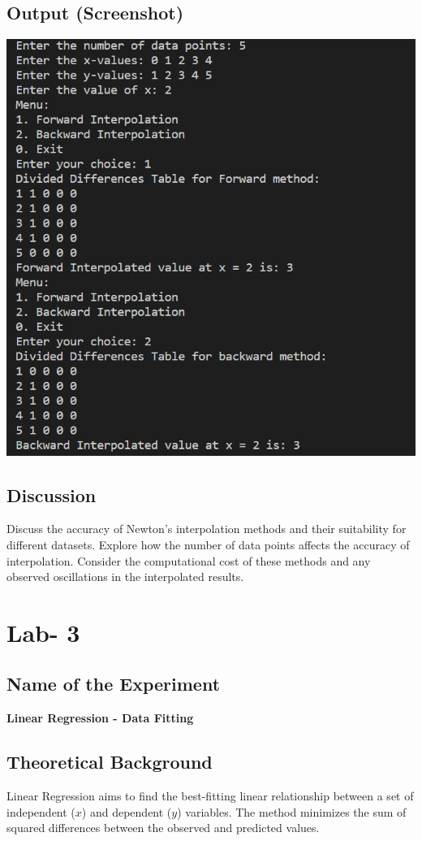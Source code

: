 \documentclass{article}
\begin{document}
\subsection*{Output (Screenshot)}
\includegraphics[width=\textwidth]{lab2.png}

\subsection*{Discussion}
Discuss the accuracy of Newton's interpolation methods and their suitability for different datasets. Explore how the number of data points affects the accuracy of interpolation. Consider the computational cost of these methods and any observed oscillations in the interpolated results.

\clearpage

\section*{\centering Lab- 3}

\subsection*{Name of the Experiment}
\textbf{Linear Regression - Data Fitting}

\subsection*{Theoretical Background}
Linear Regression aims to find the best-fitting linear relationship between a set of independent ($x$) and dependent ($y$) variables. The method minimizes the sum of squared differences between the observed and predicted values.
\end{document}
